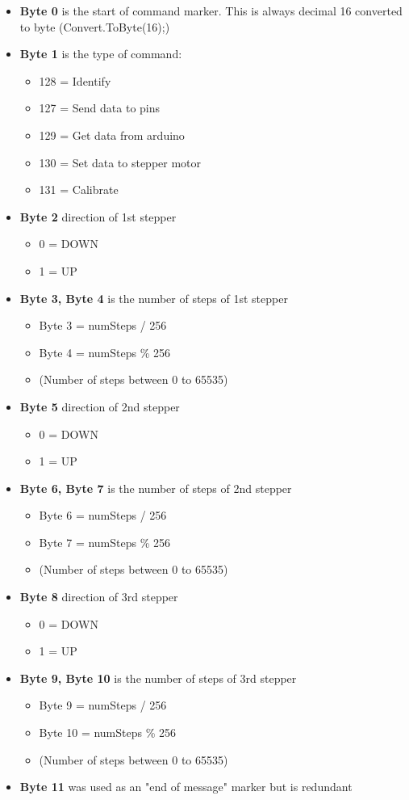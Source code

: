 \begin{itemize}
		\item \textbf{Byte 0} is the start of command marker. This is always decimal 16 converted to byte (Convert.ToByte(16);)
		\item \textbf{Byte 1} is the type of command: 
		\begin{itemize}
		\item [ ] 128 = Identify
		\item [ ] 127 = Send data to pins
		\item [ ] 129 = Get data from arduino
		\item [ ] 130 = Set data to stepper motor
		\item [ ] 131 = Calibrate
		\end{itemize}
		\item \textbf{Byte 2} direction of 1st stepper
		\begin{itemize}
		\item [ ] 0 = DOWN
		\item [ ] 1 = UP
		\end{itemize}
		\item \textbf{Byte 3, Byte 4} is the number of steps of 1st stepper
		\begin{itemize}
		\item [ ] Byte 3 = numSteps / 256
		\item [ ] Byte 4 = numSteps \% 256
		\item [ ] (Number of steps between 0 to 65535)
		\end{itemize}
		\item \textbf{Byte 5} direction of 2nd stepper
		\begin{itemize}
		\item [ ] 0 = DOWN
		\item [ ] 1 = UP
		\end{itemize}
		\item \textbf{Byte 6, Byte 7} is the number of steps of 2nd stepper
		\begin{itemize}
		\item [ ] Byte 6 = numSteps / 256
		\item [ ] Byte 7 = numSteps \% 256
		\item [ ] (Number of steps between 0 to 65535)
		\end{itemize}
		\item \textbf{Byte 8} direction of 3rd stepper
		\begin{itemize}
		\item [ ] 0 = DOWN
		\item [ ] 1 = UP
		\end{itemize}
		\item \textbf{Byte 9, Byte 10} is the number of steps of 3rd stepper
		\begin{itemize}
		\item [ ] Byte 9 = numSteps / 256
		\item [ ] Byte 10 = numSteps \% 256
		\item [ ] (Number of steps between 0 to 65535)
		\end{itemize}
		\item \textbf{Byte 11} was used as an "end of message" marker but is redundant
\end{itemize}

